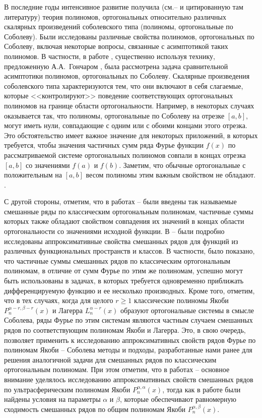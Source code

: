 В последние годы интенсивное развитие получила (см.\cite{Haar-Tcheb-IserKoch}--\cite{Haar-Tcheb-MarcelXu} и цитированную там литературу) теория полиномов, ортогональных относительно различных скалярных произведений соболевского типа (полиномы, ортогональные по Соболеву).
Были исследованы различные свойства полиномов, ортогональных по Соболеву, включая некоторые вопросы, связанные с асимптотикой таких полиномов. В частности, в работе \cite{Haar-Tcheb-Lopez1995}, существенно используя технику, предложенную А.А.~Гончаром \cite{Haar-Tcheb-Gonchar1975}, была рассмотрена задача сравнительной асимптотики полиномов, ортогональных по Соболеву.
Скалярные произведения соболевского типа характеризуются тем, что они включают в себя слагаемые, которые <<контролируют>> поведение соответствующих ортогональных полиномов на границе области ортогональности. Например, в некоторых случаях оказывается так, что полиномы, ортогональные по Соболеву на отрезке $[a,b]$, могут иметь нули, совпадающие с одним или с обоими концами этого отрезка. Это обстоятельство имеет важное значение для некоторых приложений, в которых требуется, чтобы значения  частичных сумм ряда Фурье функции $f(x)$ по рассматриваемой системе ортогональных полиномов совпали в концах отрезка $[a,b]$ со значениями $f(a)$ и $f(b)$. Заметим, что обычные ортогональные с положительным на  $[a,b]$ весом полиномы этим важным свойством не обладают. \cite{Haar-Tcheb-Lopez1995, Haar-Tcheb-Gonchar1975}.

С другой стороны, отметим, что в работах  \cite{Haar-Tcheb-Shar11} -- \cite{Haar-Tcheb-Shar18}  были введены так называемые смешанные ряды по классическим ортогональным полиномам, частичные суммы которых также обладают свойством совпадения их значений в концах области ортогональности со значениями исходной функции.  В \cite{Haar-Tcheb-Shar11} -- \cite{Haar-Tcheb-Shar18} были подробно исследованы аппроксимативные свойства смешанных рядов для функций из различных функциональных пространств и классов. В частности, было показано, что частичные суммы смешанных рядов по классическим ортогональным полиномам, в отличие от сумм Фурье по этим же полиномам, успешно могут быть использованы в задачах, в которых требуется одновременно приближать дифференцируемую функцию и ее несколько производных. Кроме того, отметим, что в тех случаях, когда для целого $r\ge1$ классические полиномы Якоби $P_n^{\alpha-r,\beta-r}(x)$ и Лагерра $L_n^{\alpha-r}(x)$ образуют ортогональные системы в смысле Соболева, ряды Фурье по этим системам являются частным случаем смешанных рядов по соответствующим полиномам Якоби и Лагерра. Это, в свою очередь,  позволяет  применить к исследованию аппроксимативных свойств рядов Фурье по полиномам Якоби -- Соболева методы и подходы, разработанные нами ранее для решения аналогичной задачи для смешанных рядов по классическим ортогональным полиномам. При этом отметим, что в  работах
\cite{Haar-Tcheb-Shar11} -- \cite{sob-jac-discrete-Shar17} основное внимание уделялось исследованию аппроксимативных свойств смешанных рядов по ультрасферическим полиномам Якоби  $P_n^{\alpha,\alpha}(x)$, тогда как в работе \cite{Haar-Tcheb-Shar18} были найдены условия на параметры $\alpha$ и $\beta$, которые обеспечивают равномерную сходимость смешанных рядов по общим полиномам Якоби $P_n^{\alpha,\beta}(x)$.

